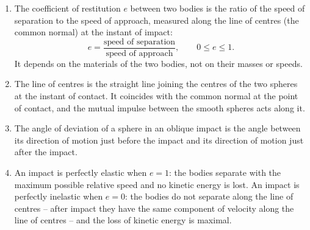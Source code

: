 \documentclass[11pt]{article}
\newcommand{\cle}[1]{{\popxbold\color{popdark}#1}}
\begin{document}
\begin{corrige}
\begin{enumerate}
\item The \cle{coefficient of restitution} $e$ between two bodies is the ratio of the speed of separation to the speed of approach, measured along the line of centres (the common normal) at the instant of impact:
\[ e=\frac{\text{speed of separation}}{\text{speed of approach}}, \qquad 0\le e\le 1. \]
It depends on the materials of the two bodies, not on their masses or speeds.
\item The \cle{line of centres} is the straight line joining the centres of the two spheres at the instant of contact. It coincides with the common normal at the point of contact, and the mutual impulse between the smooth spheres acts along it.
\item The \cle{angle of deviation} of a sphere in an oblique impact is the angle between its direction of motion just before the impact and its direction of motion just after the impact.
\item An impact is \cle{perfectly elastic} when $e=1$: the bodies separate with the maximum possible relative speed and no kinetic energy is lost. An impact is \cle{perfectly inelastic} when $e=0$: the bodies do not separate along the line of centres -- after impact they have the same component of velocity along the line of centres -- and the loss of kinetic energy is maximal.
\end{enumerate}
\end{corrige}
\end{document}
